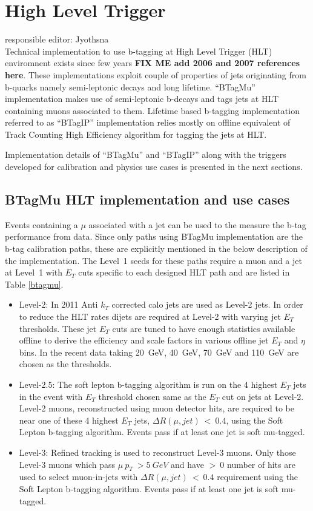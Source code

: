 \section{High Level Trigger}
responsible editor: Jyothsna\\
Technical implementation to use b-tagging at High Level Trigger (HLT) enviromnent
exists since few years \textbf{FIX ME add 2006 and 2007 references here}.
These implementations exploit couple of properties of jets originating 
from b-quarks namely semi-leptonic decays and long lifetime. ``BTagMu'' 
implementation makes use of semi-leptonic b-decays and tags jets at
HLT containing muons associated to them. Lifetime based b-tagging
implementation referred to as ``BTagIP'' implementation relies mostly on 
offline equivalent of Track Counting High Efficiency algorithm for
tagging the jets at HLT. 

Implementation details of ``BTagMu'' and ``BTagIP'' along with the 
triggers developed for calibration and physics use cases is 
presented in the next sections.

\subsection{BTagMu HLT implementation and use cases}
Events containing a $\mu$ associated with a jet can be used to the
measure the b-tag performance from data. Since only paths using BTagMu
implementation are the b-tag calibration paths, these are
explicitly mentioned in the below description of the implementation.
The Level~1 seeds for these paths require a muon and a jet at Level~1
with $E_T$ cuts specific to each designed HLT path and are listed in 
Table \ref{btagmu}.

\begin{itemize}
\item Level-2: In 2011 Anti $k_T$ corrected calo jets are used as
  Level-2 jets. In order to reduce the HLT rates dijets are required
  at Level-2 with varying jet $E_T$ thresholds. These jet $E_T$ cuts
  are tuned to have enough statistics available offline to derive the
  efficiency and scale factors in various offline jet $E_T$ and $\eta$
  bins. In the recent data taking 20~GeV, 40~GeV, 70~GeV and 110~GeV
  are chosen as the thresholds.
\item Level-2.5: The soft lepton b-tagging algorithm is run on the 4 highest $E_T$ jets in the event
  with $E_T$ threshold chosen same as the $E_T$ cut on jets at
  Level-2. Level-2 muons, reconstructed using muon detector hits,
  are required to be near one of these 4 highest $E_T$ jets, $\Delta R(\mu, jet)
  ~<~0.4$, using the Soft Lepton b-tagging algorithm. Events pass if
  at least one jet is soft mu-tagged.
\item Level-3: Refined tracking is used to reconstruct Level-3
  muons. Only those Level-3 muons which pass $\mu~p_T~>5~GeV$ and have
  $>~0$ number of hits are used to select muon-in-jets with $\Delta R(\mu, jet)
  ~<~0.4$ requirement using the Soft Lepton b-tagging algorithm. Events pass if
  at least one jet is soft mu-tagged.
\end{itemize}

